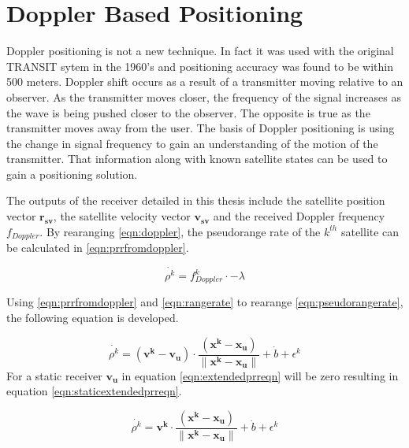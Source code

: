 \documentclass[12pt]{report}
\begin{document}
\section{Doppler Based Positioning} \label{sec:DopplerPosTechnique}
Doppler positioning is not a new technique. In fact it was used with the original TRANSIT sytem in the 1960's and positioning accuracy was found to be within 500 meters. Doppler shift occurs as a result of a transmitter moving relative to an observer. As the transmitter moves closer, the frequency of the signal increases as the wave is being pushed closer to the observer. The opposite is true as the transmitter moves away from the user. The basis of Doppler positioning is using the change in signal frequency to gain an understanding of the motion of the transmitter. That information along with known satellite states can be used to gain a positioning solution.

The outputs of the receiver detailed in this thesis include the satellite position vector $\mathbf{r_{sv}}$, the satellite velocity vector $\mathbf{v_{sv}}$ and the received Doppler frequency $f_{Doppler}$. By rearanging \ref{eqn:doppler}, the pseudorange rate of the $k^{th}$ satellite can be calculated in \ref{eqn:prrfromdoppler}.

\begin{equation}
    \dot{\rho^{k}} = f_{Doppler}^{k} \cdot -\lambda
    \label{eqn:prrfromdoppler}
\end{equation}

Using \ref{eqn:prrfromdoppler} and \ref{eqn:rangerate} to rearange \ref{eqn:pseudorangerate}, the following equation is developed.

\begin{equation}
    \dot{\rho^{k}} = (\mathbf{v^{k}} - \mathbf{v_u}) \cdot \frac{(\mathbf{x^k} - \mathbf{x_u})}{\| \mathbf{x^k} - \mathbf{x_u}\|} + \dot{b} + \epsilon^{k}
    \label{eqn:extendedprreqn}
\end{equation}
For a static receiver $\mathbf{v_u}$ in equation \ref{eqn:extendedprreqn} will be zero resulting in equation \ref{eqn:staticextendedprreqn}.

\begin{equation}
    \dot{\rho^{k}} = \mathbf{v^{k}} \cdot \frac{(\mathbf{x^k} - \mathbf{x_u})}{\| \mathbf{x^k} - \mathbf{x_u}\|} + \dot{b} + \epsilon^{k}
    \label{eqn:staticextendedprreqn}
\end{equation}
\end{document}
